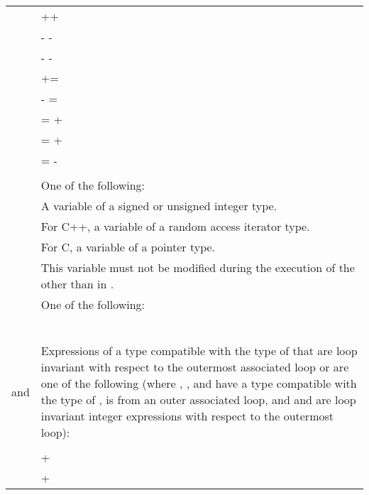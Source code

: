 \begin{ccppspecific}
\begin{supertabular}{ p{0.8in} p{4.5in}}
    & {}++\\
    & {-} {-} {}\\
    & {} {-} {-}\\
    & {} += {}\\
    & {} {-} = {}\\
    & {} = {} + {}\\
    & {} = {} + {}\\
    & {} = {} - {}\\
    & \\
    {} & One of the following:\\
    & \hspace{1.5em}A variable of a signed or unsigned integer type.\\
    & \hspace{1.5em}For C++, a variable of a random access iterator type.\\
    & \hspace{1.5em}For C, a variable of a pointer type.\\
    & This variable must not be modified during the execution of the {}
    other than in {}. \\
    {} & One of the following:\\
    & {\scode{<}}\\
    & {\scode{<=}}\\
    & {\scode{>}}\\
    & {\scode{>=}}\\
    & {\scode{!=}}\\
    & \\
    {} and {} & Expressions of a type compatible with the
    type of {} that are loop invariant with respect to the outermost
    associated loop or are one of the following (where {},
    {}, and {} have a type compatible with the type of
    {}, {} is {} from an outer associated
    loop, and {} and {} are loop invariant integer
    expressions with respect to the outermost loop): \\
    & {} \\
    & {} + {} \\
    & {} + {} \\

\end{supertabular}
\end{ccppspecific}
